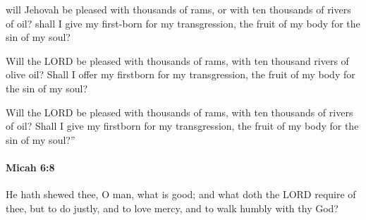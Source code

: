 			\begin{versebox}
					\item[BHS] 
					\item[LXX] 
					\item[ASV] will Jehovah be pleased with thousands of rams, or with ten thousands of rivers of oil? shall I give my first-born for my transgression, the fruit of my body for the sin of my soul?
					\item[NIV] Will the LORD be pleased with thousands of rams, with ten thousand rivers of olive oil? Shall I offer my firstborn for my transgression, the fruit of my body for the sin of my soul?
					\item[NRSV] Will the LORD be pleased with thousands of rams, with ten thousands of rivers of oil? Shall I give my firstborn for my transgression, the fruit of my body for the sin of my soul?”
			\end{versebox}

		\paragraph{Micah 6:8} %
			\label{MICAH-6-8}

			He hath shewed thee, O man, what is good; and what doth the LORD require of thee, but to do justly, and to love mercy, and to walk humbly with thy God?

